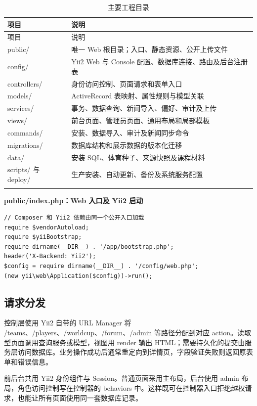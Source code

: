 \documentclass[UTF8,a4paper,11pt]{ctexart}
\begin{document}
\begin{longtable}{>{\raggedright\arraybackslash}p{}>{\raggedright\arraybackslash}p{}}\toprule 项目 & 说明\\\midrule\endfirsthead\toprule 项目 & 说明\\\midrule\endhead
public/ & 唯一 Web 根目录；入口、静态资源、公开上传文件\\\midrule
config/ & Yii2 Web 与 Console 配置、数据库连接、路由及后台注册表\\\midrule
controllers/ & 身份访问控制、页面请求和表单入口\\\midrule
models/ & ActiveRecord 表映射、属性规则与模型关联\\\midrule
services/ & 事务、数据查询、新闻导入、偏好、审计及上传\\\midrule
views/ & 前台页面、管理员页面、通用布局和局部模板\\\midrule
commands/ & 安装、数据导入、审计及新闻同步命令\\\midrule
migrations/ & 数据库结构和展示数据的版本化迁移\\\midrule
data/ & 安装 SQL、体育种子、来源快照及课程材料\\\midrule
scripts/ 与 deploy/ & 生产安装、自动更新、备份及系统服务配置\\\midrule
\bottomrule\caption{主要工程目录}\end{longtable}

\noindent\textbf{public/index.php：Web 入口及 Yii2 启动}\par\vspace{2pt}
\begin{lstlisting}
// Composer 和 Yii2 依赖由同一个公开入口加载
require $vendorAutoload;
require $yiiBootstrap;
require dirname(__DIR__) . '/app/bootstrap.php';
header('X-Backend: Yii2');
$config = require dirname(__DIR__) . '/config/web.php';
(new yii\web\Application($config))->run();
\end{lstlisting}

\subsection{请求分发}
控制层使用 Yii2 自带的 URL Manager 将 /teams、/players、/worldcup、/forum、/admin 等路径分配到对应 action。读取型页面调用查询服务或模型，视图用 render 输出 HTML；需要持久化的提交由服务层访问数据库。业务操作成功后通常重定向到详情页，字段验证失败则返回原表单和错误信息。

前后台共用 Yii2 身份组件与 Session。普通页面采用主布局，后台使用 admin 布局，角色访问控制写在控制器的 behaviors 中。这样既可在控制器入口拒绝越权请求，也能让所有页面使用同一套数据库记录。
\end{document}
